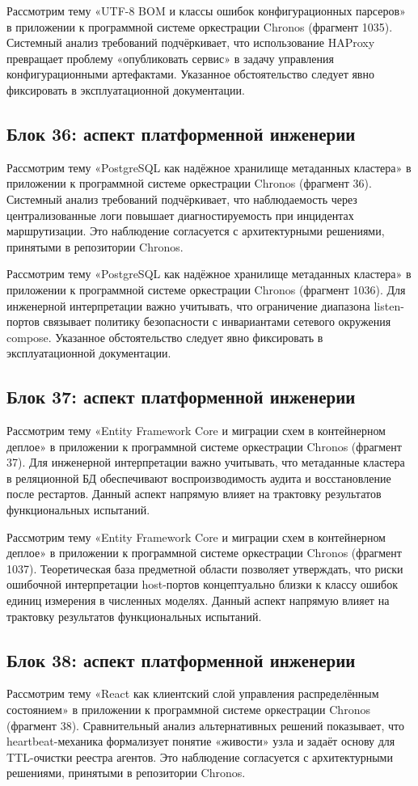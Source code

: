  Рассмотрим тему «UTF-8 BOM и классы ошибок конфигурационных парсеров» в приложении к программной системе оркестрации Chronos (фрагмент 1035). Системный анализ требований подчёркивает, что использование HAProxy превращает проблему «опубликовать сервис» в задачу управления конфигурационными артефактами. Указанное обстоятельство следует явно фиксировать в эксплуатационной документации.

\subsection{Блок 36: аспект платформенной инженерии}
 Рассмотрим тему «PostgreSQL как надёжное хранилище метаданных кластера» в приложении к программной системе оркестрации Chronos (фрагмент 36). Системный анализ требований подчёркивает, что наблюдаемость через централизованные логи повышает диагностируемость при инцидентах маршрутизации. Это наблюдение согласуется с архитектурными решениями, принятыми в репозитории Chronos.

 Рассмотрим тему «PostgreSQL как надёжное хранилище метаданных кластера» в приложении к программной системе оркестрации Chronos (фрагмент 1036). Для инженерной интерпретации важно учитывать, что ограничение диапазона listen-портов связывает политику безопасности с инвариантами сетевого окружения compose. Указанное обстоятельство следует явно фиксировать в эксплуатационной документации.

\subsection{Блок 37: аспект платформенной инженерии}
 Рассмотрим тему «Entity Framework Core и миграции схем в контейнерном деплое» в приложении к программной системе оркестрации Chronos (фрагмент 37). Для инженерной интерпретации важно учитывать, что метаданные кластера в реляционной БД обеспечивают воспроизводимость аудита и восстановление после рестартов. Данный аспект напрямую влияет на трактовку результатов функциональных испытаний.

 Рассмотрим тему «Entity Framework Core и миграции схем в контейнерном деплое» в приложении к программной системе оркестрации Chronos (фрагмент 1037). Теоретическая база предметной области позволяет утверждать, что риски ошибочной интерпретации host-портов концептуально близки к классу ошибок единиц измерения в численных моделях. Данный аспект напрямую влияет на трактовку результатов функциональных испытаний.

\subsection{Блок 38: аспект платформенной инженерии}
 Рассмотрим тему «React как клиентский слой управления распределённым состоянием» в приложении к программной системе оркестрации Chronos (фрагмент 38). Сравнительный анализ альтернативных решений показывает, что heartbeat-механика формализует понятие «живости» узла и задаёт основу для TTL-очистки реестра агентов. Это наблюдение согласуется с архитектурными решениями, принятыми в репозитории Chronos.

